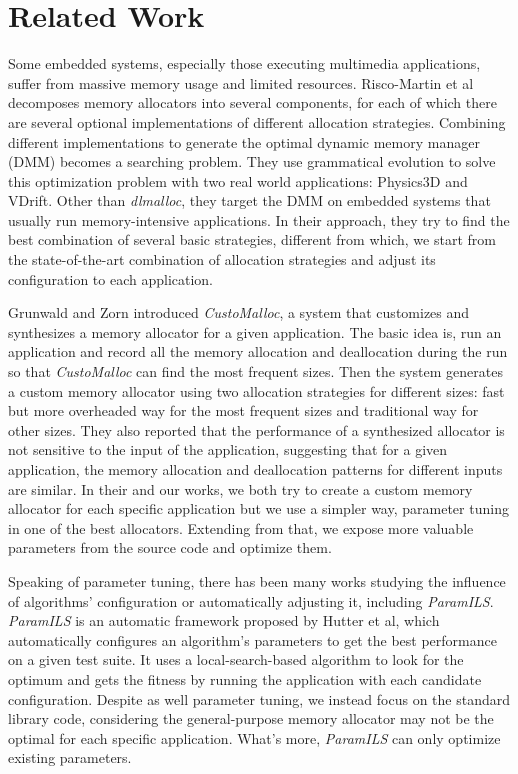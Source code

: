 \section{Related Work}

Some embedded systems, especially those executing multimedia applications, suffer from massive memory usage and limited resources. Risco-Martin et al\cite{Risco-Martin:2009:ODM:1569901.1570116}\cite{RiscoMartin2010572} decomposes memory allocators into several components, for each of which there are several optional implementations of different allocation strategies. Combining different implementations to generate the optimal dynamic memory manager (DMM) becomes a searching problem. They use grammatical evolution to solve this optimization problem with two real world applications: Physics3D and VDrift. Other than \emph{dlmalloc}, they target the DMM on embedded systems that usually run memory-intensive applications. In their approach, they try to find the best combination of several basic strategies, different from which, we start from the state-of-the-art combination of allocation strategies and adjust its configuration to each application. 

Grunwald and Zorn introduced \emph{CustoMalloc}, a system that customizes and synthesizes a memory allocator for a given application\cite{SPE:SPE4380230804}. The basic idea is, run an application and record all the memory allocation and deallocation during the run so that \emph{CustoMalloc} can find the most frequent sizes. Then the system generates a custom memory allocator using two allocation strategies for different sizes: fast but more overheaded way for the most frequent sizes and traditional way for other sizes. They also reported that the performance of a synthesized allocator is not sensitive to the input of the application, suggesting that for a given application, the memory allocation and deallocation patterns for different inputs are similar. In their and our works, we both try to create a custom memory allocator for each specific application but we use a simpler way, parameter tuning in one of the best allocators. Extending from that, we expose more valuable parameters from the source code and optimize them.

Speaking of parameter tuning, there has been many works studying the influence of algorithms' configuration or automatically adjusting it, including \emph{ParamILS}\cite{hutter2009paramils}. \emph{ParamILS} is an automatic framework proposed by Hutter et al, which automatically configures an algorithm's parameters to get the best performance on a given test suite. It uses a local-search-based algorithm to look for the optimum and gets the fitness by running the application with each candidate configuration. Despite as well parameter tuning, we instead focus on the standard library code, considering the general-purpose memory allocator may not be the optimal for each specific application. What's more, \emph{ParamILS} can only optimize existing parameters. 

